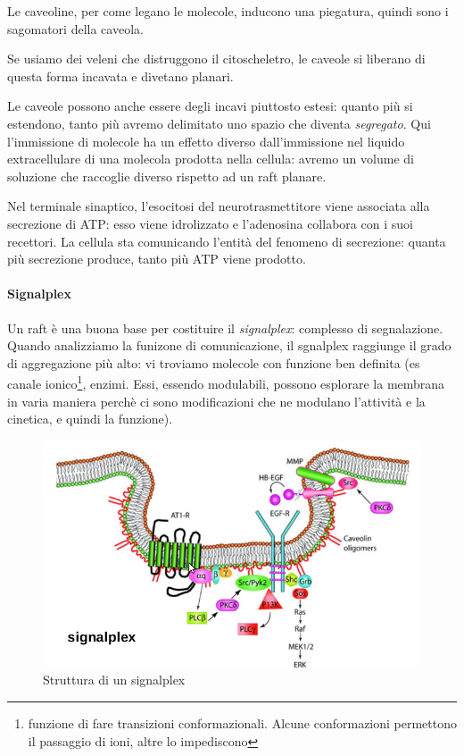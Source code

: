 \documentclass[a4paper,12pt]{article}
\begin{document}
Le caveoline, per come legano le molecole, inducono una piegatura, quindi sono i sagomatori della caveola.

Se usiamo dei veleni che distruggono il citoscheletro, le caveole si liberano di questa forma incavata e divetano planari.

Le caveole possono anche essere degli incavi piuttosto estesi: quanto più si estendono, tanto più avremo delimitato uno spazio che diventa \emph{segregato}. Qui l'immissione di molecole ha un effetto diverso dall'immissione nel liquido extracellulare di una molecola prodotta nella cellula: avremo un volume di soluzione che raccoglie diverso rispetto ad un raft planare.

Nel terminale sinaptico, l'esocitosi del neurotrasmettitore viene associata alla secrezione di ATP: esso viene idrolizzato e l'adenosina collabora con i suoi recettori. La cellula sta comunicando l'entità del fenomeno di secrezione: quanta più secrezione produce, tanto più ATP viene prodotto. 

\paragraph{Signalplex}

Un raft è una buona base per costituire il \emph{signalplex}: complesso di segnalazione. Quando analizziamo la funizone di comunicazione, il sgnalplex raggiunge il grado di aggregazione più alto: vi troviamo molecole con funzione ben definita (es canale ionico\footnote{funzione di fare transizioni conformazionali. Alcune conformazioni permettono il passaggio di ioni, altre lo impediscono}, enzimi. Essi, essendo modulabili, possono esplorare la membrana in varia maniera perchè ci sono modificazioni che ne modulano l'attività e la cinetica, e quindi la funzione). 

\begin{figure}[H]
\centering
\includegraphics[scale=0.4]{immagine/plex.jpg}
\caption{Struttura di un signalplex}
\end{figure}
\end{document}
